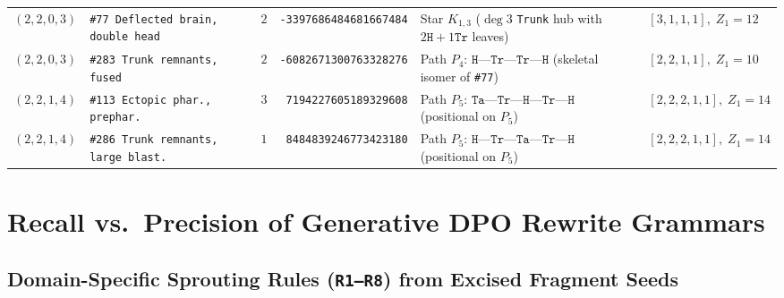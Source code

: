 \documentclass[11pt,a4paper]{article}
\theoremstyle{definition}
\theoremstyle{remark}
\begin{document}
\begin{table}[H]
\begin{tabular}{@{}llrrll@{}}
\midrule
$(2, 2, 0, 3)$ & \texttt{\#77 Deflected brain, double head} & $2$ & \texttt{-3397686484681667484} & Star $K_{1,3}$ ($\deg 3$ \texttt{Trunk} hub with $2\mathtt{H}+1\mathtt{Tr}$ leaves) & $[3,1,1,1],\; Z_1 = 12$ \\
$(2, 2, 0, 3)$ & \texttt{\#283 Trunk remnants, fused} & $2$ & \texttt{-6082671300763328276} & Path $P_4$: $\mathtt{H}\text{---}\mathtt{Tr}\text{---}\mathtt{Tr}\text{---}\mathtt{H}$ (skeletal isomer of \texttt{\#77}) & $[2,2,1,1],\; Z_1 = 10$ \\
\midrule
$(2, 2, 1, 4)$ & \texttt{\#113 Ectopic phar., prephar.} & $3$ & \texttt{7194227605189329608} & Path $P_5$: $\mathtt{Ta}\text{---}\mathtt{Tr}\text{---}\mathtt{H}\text{---}\mathtt{Tr}\text{---}\mathtt{H}$ (positional on $P_5$) & $[2,2,2,1,1],\; Z_1 = 14$ \\
$(2, 2, 1, 4)$ & \texttt{\#286 Trunk remnants, large blast.} & $1$ & \texttt{8484839246773423180} & Path $P_5$: $\mathtt{H}\text{---}\mathtt{Tr}\text{---}\mathtt{Ta}\text{---}\mathtt{Tr}\text{---}\mathtt{H}$ (positional on $P_5$) & $[2,2,2,1,1],\; Z_1 = 14$ \\
\bottomrule
\end{tabular}
\end{table}

\section{Recall vs.\ Precision of Generative DPO Rewrite Grammars}

\subsection{Domain-Specific Sprouting Rules (\texttt{R1--R8}) from Excised Fragment Seeds}
\end{document}
